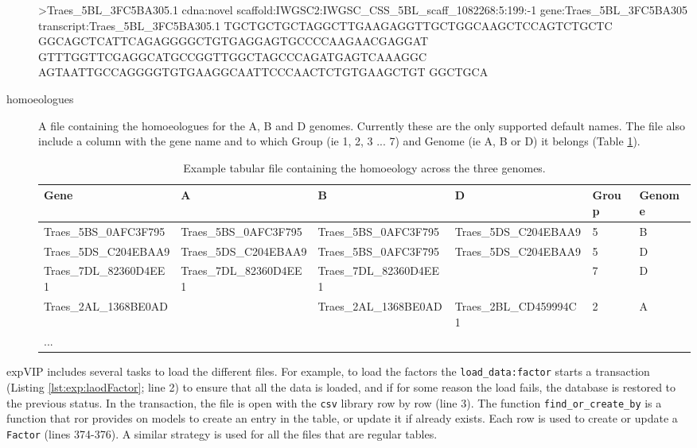 \begin{description}
\begin{code}[label=lst:poly:geneFa, caption={[Gene set fasta file] A fasta entry on of the gene set.}]
>Traes_5BL_3FC5BA305.1 cdna:novel scaffold:IWGSC2:IWGSC_CSS_5BL_scaff_1082268:5:199:-1 gene:Traes_5BL_3FC5BA305 transcript:Traes_5BL_3FC5BA305.1
TGCTGCTGCTAGGCTTGAAGAGGTTGCTGGCAAGCTCCAGTCTGCTC
GGCAGCTCATTCAGAGGGGCTGTGAGGAGTGCCCCAAGAACGAGGAT
GTTTGGTTCGAGGCATGCCGGTTGGCTAGCCCAGATGAGTCAAAGGC
AGTAATTGCCAGGGGTGTGAAGGCAATTCCCAACTCTGTGAAGCTGT
GGCTGCA
\end{code}
\item[homoeologues] A file containing the homoeologues for the  A, B and D genomes. Currently these are the only supported default names. The file also include a column with the gene name and to which Group (ie 1, 2, 3 ... 7) and Genome (ie A, B or D) it belongs (Table \ref{tab:exp:hom}).  

\begin{table}
\centering
\caption[Homoeology file]{Example tabular file containing the homoeology across the three genomes. }
\label{tab:exp:hom}
\begin{tabular}{llllll}
\toprule
Gene & A & B & D & Group & Genome \\
\midrule
Traes\_5BS\_0AFC3F795 & Traes\_5BS\_0AFC3F795 & Traes\_5BS\_0AFC3F795 & Traes\_5DS\_C204EBAA9 & 5 & B \\
Traes\_5DS\_C204EBAA9 & Traes\_5DS\_C204EBAA9 & Traes\_5BS\_0AFC3F795 & Traes\_5DS\_C204EBAA9 & 5 & D \\
Traes\_7DL\_82360D4EE1 & Traes\_7DL\_82360D4EE1 & Traes\_7DL\_82360D4EE1 & & 7 & D \\
Traes\_2AL\_1368BE0AD & & Traes\_2AL\_1368BE0AD & Traes\_2BL\_CD459994C1 & 2 & A \\
... & & & & &  \\
\bottomrule 
\end{tabular}
\end{table}
\end{description} 

expVIP includes several tasks to load the different files. 
For example, to load the factors the \verb|load_data:factor| starts a transaction (Listing \ref{lst:exp:laodFactor}; line 2) to ensure that all the data is loaded, and if for some reason the load fails, the database is restored to the previous status.
In the transaction, the file is open with the \verb|csv| library row by row (line 3).
The function \verb|find_or_create_by| is a function that \acrshort{ror} provides on models to create an entry in the table, or update it if already exists.
Each row is used to create or update a \verb|Factor| (lines 374-376). 
A similar strategy is used for all the files that are regular tables. 


